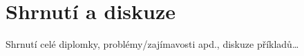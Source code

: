 \chapter*{Shrnutí a diskuze}

Shrnutí celé diplomky, problémy/zajímavosti apd., diskuze příkladů\dots